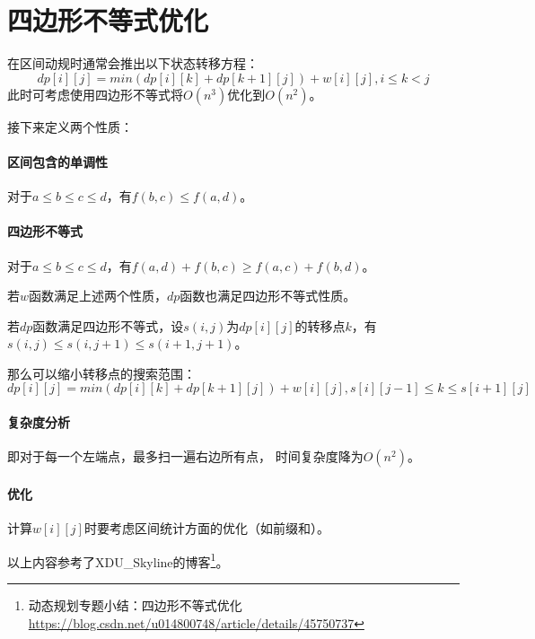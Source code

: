 \section{四边形不等式优化}
在区间动规时通常会推出以下状态转移方程：
\begin{displaymath}
    dp[i][j]=min(dp[i][k]+dp[k+1][j])+w[i][j],i\leq k <j
\end{displaymath}
此时可考虑使用四边形不等式将$O(n^3)$优化到$O(n^2)$。

接下来定义两个性质：
\paragraph{区间包含的单调性}
对于$a\leq b\leq c\leq d$，有$f(b,c)\leq f(a,d)$。
\paragraph{四边形不等式}
对于$a\leq b\leq c\leq d$，有$f(a,d)+f(b,c)\geq f(a,c)+f(b,d)$。

\begin{theorem}
    若$w$函数满足上述两个性质，$dp$函数也满足四边形不等式性质。
\end{theorem}

\begin{theorem}
    若$dp$函数满足四边形不等式，设$s(i,j)$为$dp[i][j]$的转移点$k$，有
    $s(i,j)\leq s(i,j+1)\leq s(i+1,j+1)$。
\end{theorem}

那么可以缩小转移点的搜索范围：
\begin{displaymath}
    dp[i][j]=min(dp[i][k]+dp[k+1][j])+w[i][j],s[i][j-1]\leq k \leq s[i+1][j]
\end{displaymath}

\paragraph{复杂度分析} 即对于每一个左端点，最多扫一遍右边所有点，
时间复杂度降为$O(n^2)$。

\paragraph{优化} 计算$w[i][j]$时要考虑区间统计方面的优化（如前缀和）。

以上内容参考了XDU\_Skyline的博客\footnote{动态规划专题小结：四边形不等式优化
    \url{https://blog.csdn.net/u014800748/article/details/45750737}
}。
